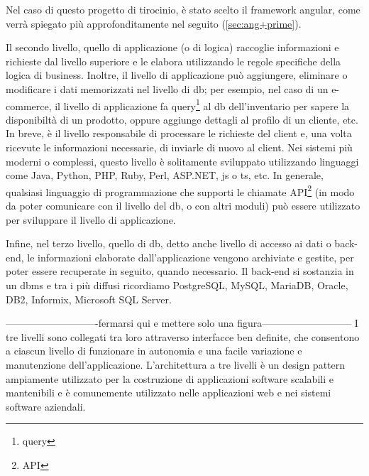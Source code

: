 Nel caso di questo progetto di tirocinio, è stato scelto il \gls{framework} \gls{angular}, come verrà spiegato più approfonditamente nel seguito (\ref{sec:ang+prime}).\newline

Il secondo livello, quello di applicazione (o di logica) raccoglie informazioni e richieste dal livello superiore e le elabora utilizzando le regole specifiche della logica di business. Inoltre, il livello di applicazione può aggiungere, eliminare o modificare i dati memorizzati nel livello di \acrlong{db}; per esempio, nel caso di un e-commerce, il livello di applicazione fa query\footnote{\glsdesc{query}} al \acrlong{db} dell'inventario per sapere la disponibiltà di un prodotto, oppure aggiunge dettagli al profilo di un cliente, etc.
In breve, è il livello responsabile di processare le richieste del client e, una volta ricevute le informazioni necessarie, di inviarle di nuovo al client.
Nei sistemi più moderni o complessi, questo livello è solitamente sviluppato utilizzando linguaggi come Java, Python, PHP, Ruby, Perl, ASP.NET, \acrlong{js} o \acrlong{ts}, etc. In generale, qualsiasi linguaggio di programmazione che supporti le chiamate \gls{API}\footnote{\glsdesc{API}} (in modo da poter comunicare con il livello del \acrlong{db}, o con altri moduli) può essere utilizzato per sviluppare il livello di applicazione.\newline

Infine, nel terzo livello, quello di \acrlong{db}, detto anche livello di accesso ai dati o back-end, le informazioni elaborate dall'applicazione vengono archiviate e gestite, per poter essere recuperate in seguito, quando necessario. Il back-end si sostanzia in un \acrfull{dbms} e tra i più diffusi ricordiamo PostgreSQL, MySQL, MariaDB, Oracle, DB2, Informix, Microsoft SQL Server.\newline


----------------------------fermarsi qui e mettere solo una figura---------------------------\newline
I tre livelli sono collegati tra loro attraverso interfacce ben definite, che consentono a ciascun livello di funzionare in autonomia e una facile variazione e manutenzione dell'applicazione. L'architettura a tre livelli è un design pattern ampiamente utilizzato per la costruzione di applicazioni software scalabili e mantenibili e è comunemente utilizzato nelle applicazioni web e nei sistemi software aziendali.


